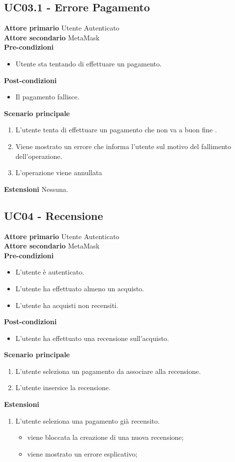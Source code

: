 \subsection{UC03.1 - Errore Pagamento}
\textbf{Attore primario} Utente Autenticato \\
\textbf{Attore secondario} MetaMask \\
\textbf{Pre-condizioni}
\begin{itemize}
    \item Utente sta tentando di effettuare un pagamento.
\end{itemize}
\textbf{Post-condizioni}
\begin{itemize}
    \item Il pagamento fallisce.
\end{itemize}
\textbf{Scenario principale}
\begin{enumerate}
    \item L'utente tenta di effettuare un pagamento che non va a buon fine .
    \item Viene mostrato un errore che informa l'utente sul motivo del fallimento dell'operazione.
    \item L'operazione viene annullata
\end{enumerate}
\textbf{Estensioni} Nessuna.

\subsection{UC04 - Recensione}
\textbf{Attore primario} Utente Autenticato \\
\textbf{Attore secondario} MetaMask \\
\textbf{Pre-condizioni}
\begin{itemize}
    \item L'utente è autenticato.
    \item L'utente ha effettuato almeno un acquisto.
    \item L'utente ha acquisti non recensiti.
\end{itemize}
\textbf{Post-condizioni}
\begin{itemize}
    \item L'utente ha effettuato una recensione sull'acquisto.
\end{itemize}
\textbf{Scenario principale}
\begin{enumerate}
    \item L'utente seleziona un pagamento da associare alla recensione.
    \item L'utente insersice la recensione.
\end{enumerate}
\textbf{Estensioni}
\begin{enumerate}
    \item L'utente seleziona una pagamento già recensito.
    \begin{itemize}
        \item viene bloccata la creazione di una nuova recensione;
        \item viene mostrato un errore esplicativo;
    \end{itemize}
\end{enumerate}

